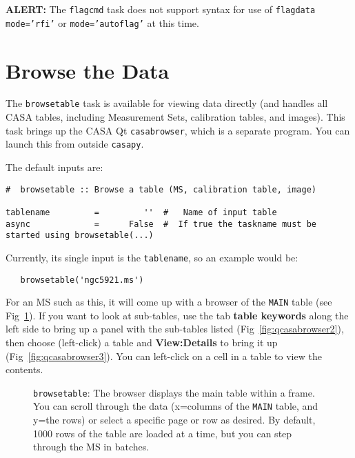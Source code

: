 {\bf ALERT:} The {\tt flagcmd} task does not support syntax for use of
{\tt flagdata} {\tt mode='rfi'} or {\tt mode='autoflag'} at
this time.

\section{Browse the Data}
\label{section:edit.browse}

The {\tt browsetable} task is available for viewing data directly
(and handles all CASA tables, including Measurement Sets, calibration tables,
and images). This task brings up the CASA Qt
{\tt casabrowser}, which is a separate program.  You can launch this
from outside {\tt casapy}.  

The default inputs are:
\small
\begin{verbatim}
#  browsetable :: Browse a table (MS, calibration table, image)

tablename         =         ''  #   Name of input table
async             =      False  #  If true the taskname must be started using browsetable(...)

\end{verbatim}
\normalsize

Currently, its single input is the {\tt tablename}, so an example would
be:
\small
\begin{verbatim}
   browsetable('ngc5921.ms')
\end{verbatim}
\normalsize
For an MS such as this, it will come up with a browser of the 
{\tt MAIN} table (see Fig~\ref{fig:qcasabrowser1}).  
If you want to look at sub-tables, use the tab 
{\bf table keywords} along the left side to bring up a panel with the sub-tables
listed (Fig~\ref{fig:qcasabrowser2}), then choose (left-click) a table and
{\bf View:Details} to bring it up (Fig~\ref{fig:qcasabrowser3}).  
You can left-click on a cell in a table to view the
contents.

\begin{figure}[h!]
\begin{center}
\caption{\label{fig:qcasabrowser1} {\tt browsetable}: The browser displays
  the main table within a frame. You can scroll
  through the data (x=columns of the {\tt MAIN} table, and y=the rows) or
  select a specific page or row as desired.  By default, 1000 rows of
  the table are loaded at a time, but you can step through the MS in batches.} 
\hrulefill
\end{center}
\end{figure}

